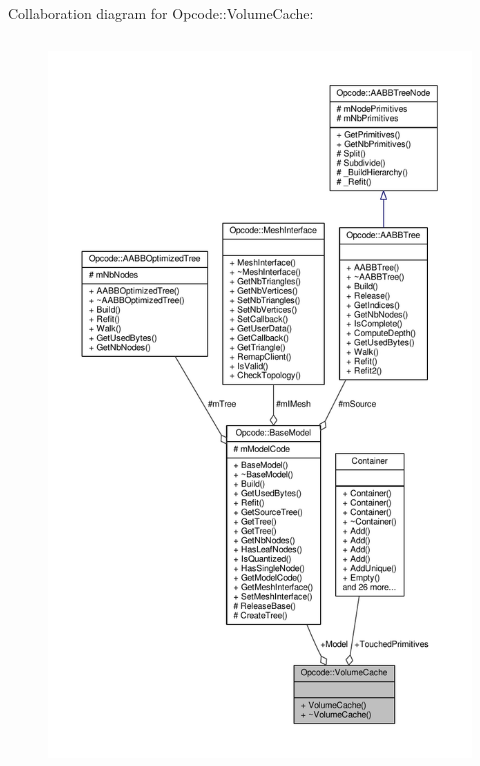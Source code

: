 Collaboration diagram for Opcode\+:\+:Volume\+Cache\+:
\nopagebreak
\begin{figure}[H]
\begin{center}
\leavevmode
\includegraphics[height=550pt]{dd/d6b/structOpcode_1_1VolumeCache__coll__graph}
\end{center}
\end{figure}
